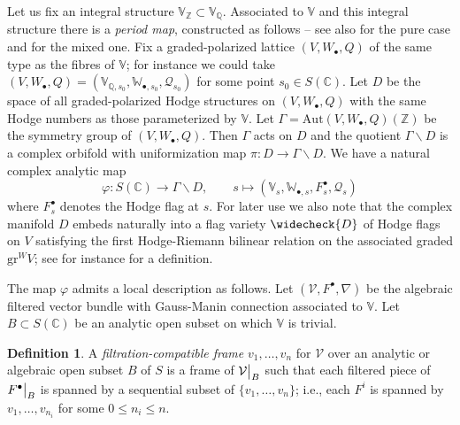 \documentclass[10pt]{article}
\numberwithin{equation}{section}
\theoremstyle{plain}
\theoremstyle{definition}
\newtheorem{defn}[thm]{Definition}
\theoremstyle{remark}
\newcommand\restr[2]{{
	\left.\kern-\nulldelimiterspace
	#1
	\vphantom{\big|}
	\right|_{#2}
	}}
\newcommand{\Aut}{\textrm{Aut}}
\newcommand{\ch}[1]{\widecheck{{#1}}}
\newcommand{\C}{\mathbb{C}}
\newcommand{\V}{\mathbb{V}}
\begin{document}
Let us fix an integral structure $\mathbb{V}_{\mathbb{Z}} \subset \mathbb{V}_{\mathbb{Q}}$. Associated to $\V$ and this integral structure there is a \emph{period map}, constructed as follows -- see also \cite[Sec. 4]{2021arXiv210708838B} for the pure case and \cite[Sec. 4]{2024arXiv240616628B} for the mixed one. Fix a graded-polarized lattice $(V, W_{\bullet}, Q)$ of the same type as the fibres of $\V$; for instance we could take $(V, W_{\bullet}, Q) = (\V_{\mathbb{Q}, s_{0}}, \mathbb{W}_{\bullet,s_{0}}, \mathcal{Q}_{s_{0}})$ for some point $s_{0} \in S(\mathbb{C})$. Let $D$ be the space of all graded-polarized Hodge structures on $(V, W_{\bullet}, Q)$ with the same Hodge numbers as those parameterized by $\V$. Let $\Gamma = \Aut(V, W_{\bullet}, Q)(\mathbb{Z})$ be the symmetry group of $(V, W_{\bullet}, Q)$. Then $\Gamma$ acts on $D$ and the quotient $\Gamma \backslash D$ is a complex orbifold with uniformization map $\pi : D \to \Gamma \backslash D$. We have a natural complex analytic map
\[ \varphi : S(\C) \to \Gamma \backslash D, \hspace{2em} s \mapsto (\V_{s}, \mathbb{W}_{\bullet,s}, F^{\bullet}_{s}, \mathcal{Q}_{s}) \]
where $F^{\bullet}_{s}$ denotes the Hodge flag at $s$. For later use we also note that the complex manifold $D$ embeds naturally into a flag variety $\ch{D}$ of Hodge flags on $V$ satisfying the first Hodge-Riemann bilinear relation on the associated graded $\textrm{gr}^{W} V$; see for instance \cite[pg.48]{zbMATH06031035} for a definition.

The map $\varphi$ admits a local description as follows. Let $(\mathcal{V}, F^{\bullet}, \nabla)$ be the algebraic filtered vector bundle with Gauss-Manin connection associated to $\V$. Let $B \subset S(\mathbb{C})$ be an analytic open subset on which $\V$ is trivial.


\begin{defn}
A \emph{filtration-compatible frame} $v_{1}, \hdots, v_{n}$ for $\mathcal{V}$ over an analytic or algebraic open subset $B$ of $S$ is a frame of $\restr{\mathcal{V}}{B}$ such that each filtered piece of $\restr{F^{\bullet}}{B}$ is spanned by a sequential subset of $\{ v_{1}, \hdots, v_{n} \}$; i.e., each $F^{i}$ is spanned by $v_{1}, \hdots, v_{n_{i}}$ for some $0 \leq n_{i} \leq n$. 
\end{defn}
\end{document}
